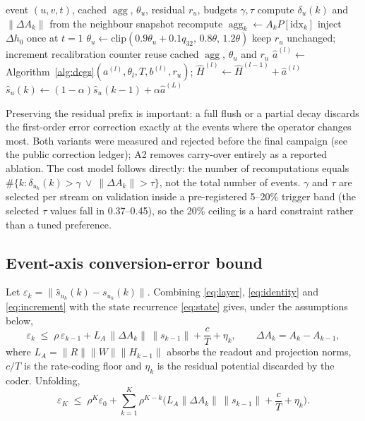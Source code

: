 \documentclass[preprint,12pt]{elsarticle}
\begin{document}
\begin{algorithm}[t]
\caption{TCAR event loop for one node}
\label{alg:tcar}
\begin{algorithmic}[1]
\Require event $(u,v,t)$, cached $\operatorname{agg}$, $\theta_u$, residual $r_u$, budgets $\gamma, \tau$
\State compute $\delta_u(k)$ and $\|\Delta A_k\|$ from the neighbour snapshot
  \State recompute $\operatorname{agg}_k\leftarrow A_k P[\mathrm{idx}_k]$
  \State inject $\Delta h_0$ once at $t{=}1$
  \State $\theta_u\leftarrow \mathrm{clip}(0.9\theta_u+0.1 q_{32},\,0.8\theta,\,1.2\theta)$
  \State keep $r_u$ unchanged; \quad increment recalibration counter
\Else
  \State reuse cached $\operatorname{agg}$, $\theta_u$ and $r_u$
\EndIf
{}
  \State $\hat a^{(l)}\leftarrow$ Algorithm~\ref{alg:dcgs}$(a^{(l)},\theta_l,T,b^{(l)},r_u)$; \quad $\hat H^{(l)}\leftarrow\hat H^{(l-1)}+\hat a^{(l)}$
\EndFor
\State $\hat s_u(k)\leftarrow(1-\alpha)\hat s_u(k-1)+\alpha\hat a^{(L)}$
\end{algorithmic}
\end{algorithm}

Preserving the residual prefix is important: a full flush or a partial decay discards the first-order error correction exactly at the events where the operator changes most. Both variants were measured and rejected before the final campaign (see the public correction ledger); A2 removes carry-over entirely as a reported ablation. The cost model follows directly: the number of recomputations equals $\#\{k:\delta_{u_k}(k)>\gamma\ \vee\ \|\Delta A_k\|>\tau\}$, not the total number of events. $\gamma$ and $\tau$ are selected per stream on validation inside a pre-registered 5--20\% trigger band (the selected $\tau$ values fall in 0.37--0.45), so the 20\% ceiling is a hard constraint rather than a tuned preference.

\subsection{Event-axis conversion-error bound}
\label{sec:bound}

Let $\varepsilon_k=\|\hat s_{u_k}(k)-s_{u_k}(k)\|$. Combining \eqref{eq:layer}, \eqref{eq:identity} and \eqref{eq:increment} with the state recurrence \eqref{eq:state} gives, under the assumptions below,
\begin{equation}
\varepsilon_k \;\le\; \rho\,\varepsilon_{k-1}
+ L_A\,\|\Delta A_k\|\,\|s_{k-1}\|
+ \frac{c}{T}+\eta_k ,
\qquad \Delta A_k=A_k-A_{k-1},
\label{eq:bound}
\end{equation}
where $L_A=\|R\|\|W\|\|H_{k-1}\|$ absorbs the readout and projection norms, $c/T$ is the rate-coding floor and $\eta_k$ is the residual potential discarded by the coder. Unfolding,
\begin{equation}
\varepsilon_K \;\le\; \rho^{K}\varepsilon_0
+\sum_{k=1}^{K}\rho^{K-k}\Big(L_A\|\Delta A_k\|\,\|s_{k-1}\|+\frac{c}{T}+\eta_k\Big).
\label{eq:unfolded}
\end{equation}
\end{document}
